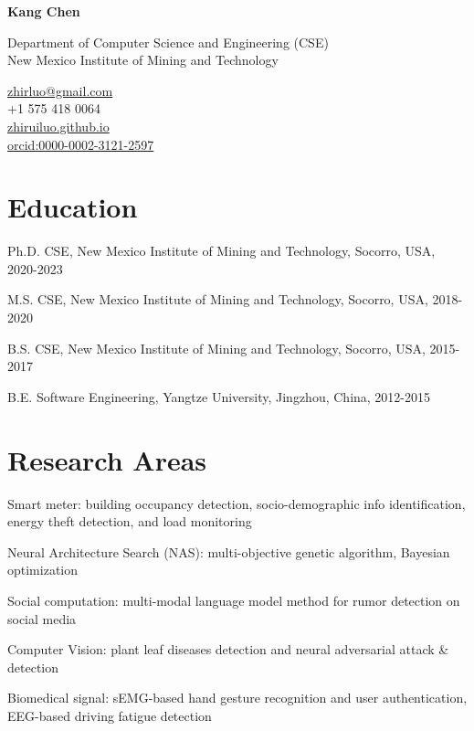 \documentclass[12pt,letterpaper]{report}
\newcommand{\myname}{Kang Chen}
\newcommand{\namefont}[1]{{\normalfont\bfseries\Huge{#1}}}
\newcommand{\listitemspace}{0.25em}
\renewenvironment{itemize}
{\begin{list}{}{\setlength{\leftmargin}{0em}
                \setlength{\parskip}{0em}
                \setlength{\itemsep}{\listitemspace}
                \setlength{\parsep}{\listitemspace}}}
{\end{list}}
\begin{document}
    \raggedright{}

    \namefont{\myname}

    \vspace{1em}
    \begin{minipage}[t]{0.700\textwidth}
        Department of Computer Science and Engineering (CSE)\\
        New Mexico Institute of Mining and Technology
    \end{minipage}
    \begin{minipage}[t]{0.295\textwidth}
        \flushright{}
        \href{mailto:zhirluo@gmail.com}{zhirluo@gmail.com} \\
        +1 575 418 0064 \\
        \href{https://zhiruiluo.github.io}{zhiruiluo.github.io}\\
        \href{https://orcid.org/0000-0002-3121-2597}{orcid:0000-0002-3121-2597}
    \end{minipage}

    \section*{Education}
    
    \begin{tablist}
      \item[Ph.D.] \tab{}CSE, New Mexico Institute of Mining and Technology, Socorro, USA, 2020-2023
      \item[M.S.] \tab{}CSE, New Mexico Institute of Mining and Technology, Socorro, USA, 2018-2020
      \item[B.S.] \tab{}CSE, New Mexico Institute of Mining and Technology, Socorro, USA, 2015-2017
      \item[B.E.] \tab{}Software Engineering, Yangtze University, Jingzhou, China, 2012-2015
    \end{tablist}
    
    \section*{Research Areas}
    \begin{itemize}
      \item Smart meter: building occupancy detection, socio-demographic info identification, energy theft detection, and load monitoring
      \item Neural Architecture Search (NAS): multi-objective genetic algorithm, Bayesian optimization
      \item Social computation: multi-modal language model method for rumor detection on social media
      \item Computer Vision: plant leaf diseases detection and neural adversarial attack \& detection
      \item Biomedical signal: sEMG-based hand gesture recognition and user authentication, EEG-based driving fatigue detection
    \end{itemize}
    
\end{document}
